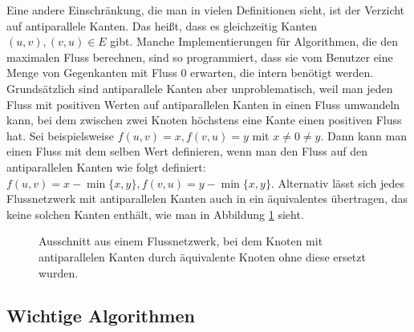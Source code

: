 Eine andere Einschränkung, die man in vielen Definitionen sieht, ist der Verzicht auf antiparallele Kanten. Das heißt, dass es gleichzeitig Kanten $(u,v), (v,u) \in E$ gibt. Manche Implementierungen für Algorithmen, die den maximalen Fluss berechnen, sind so programmiert, dass sie vom Benutzer eine Menge von Gegenkanten mit Fluss 0 erwarten, die intern benötigt werden. Grundsätzlich sind antiparallele Kanten aber unproblematisch, weil man jeden Fluss mit positiven Werten auf antiparallelen Kanten in einen Fluss umwandeln kann, bei dem zwischen zwei Knoten höchstens eine Kante einen positiven Fluss hat. Sei beispielsweise $f(u,v) = x, f(v,u) = y$ mit $x \neq 0 \neq y$. Dann kann man einen Fluss mit dem selben Wert definieren, wenn man den Fluss auf den antiparallelen Kanten wie folgt definiert: $f(u,v) = x - \min\{x,y\}, f(v,u) = y - \min\{x,y\}$. Alternativ lässt sich jedes Flussnetzwerk mit antiparallelen Kanten auch in ein äquivalentes übertragen, das keine solchen Kanten enthält, wie man in Abbildung \ref{abb:no_antiparallel} sieht.

\begin{figure}
\begin{center}
\end{center}
\caption{Ausschnitt aus einem Flussnetzwerk, bei dem Knoten mit antiparallelen Kanten durch äquivalente Knoten ohne diese ersetzt wurden.}\label{abb:no_antiparallel}
\end{figure}

\subsection{Wichtige Algorithmen}

